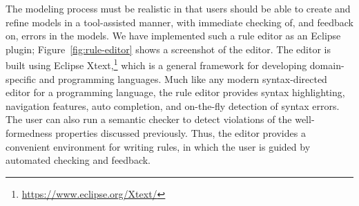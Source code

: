 The modeling process must be realistic in that users should be able to create
and refine models in a tool-assisted manner, with immediate checking of, and
feedback on, errors in the models.  We have implemented such a rule editor as an
Eclipse plugin; Figure~\ref{fig:rule-editor} shows a screenshot of the
editor. The editor is built using Eclipse
Xtext,\footnote{\url{https://www.eclipse.org/Xtext/}} which is a general
framework for developing domain-specific and programming languages. Much like
any modern syntax-directed editor for a programming language, the rule editor
provides syntax highlighting, navigation features, auto completion, and
on-the-fly detection of syntax errors.  The user can also run a semantic checker
to detect violations of the well-formedness properties discussed
previously. Thus, the editor provides a convenient environment for writing
rules, in which the user is guided by automated checking and feedback.
